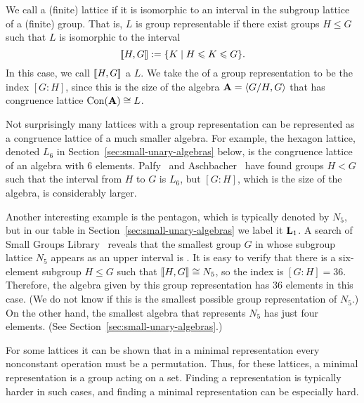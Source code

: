 
We call a (finite) lattice  if 
it is isomorphic to an interval in the subgroup lattice of a (finite) group.
That is, $L$ is group representable if there exist groups $H \leq G$
such that $L$ is isomorphic to the interval
\[
\llbracket H, G\rrbracket := \{K \mid H \leqslant K \leqslant G\}.
\]
In this case, we call $\llbracket H, G\rrbracket$ a  $L$.
We take the  of a group representation to be
the index $[G:H]$, since this is the size of the algebra $\mathbf{A} = \langle G/H, G\rangle$ that has
congruence lattice $\operatorname{Con}(\mathbf{A}) \cong L$.

Not surprisingly many lattices with a group representation
can be represented as a congruence lattice of a much smaller
algebra. For example, the hexagon lattice, denoted $L_6$ in
Section~\ref{sec:small-unary-algebras} below, is the congruence lattice
of an algebra with 6 elements. Palfy~\cite{Palfy1988} and
Aschbacher~\cite{Aschbacher2008} have found groups
$H < G$ such that the interval from $H$ to $G$ is $L_6$, but 
$[G : H]$, which is the size of the algebra, is considerably larger.

Another interesting example is the pentagon, which is typically denoted by
$N_5$, but in our table in Section~\ref{sec:small-unary-algebras} we
label it $\mathbf{L}_1$.  A search of \gaps Small Groups Library~\cite{GAP4}
reveals that the smallest group $G$ in whose subgroup lattice
$N_5$ appears as an upper interval is . It is easy
to verify that there is a six-element subgroup $H\leq G$ such that
$\llbracket H, G\rrbracket \cong N_5$, so the index is $[G:H]= 36$. Therefore,
the algebra given by this group representation has 36 elements in this case.
(We do not know if this is the smallest possible group representation of $N_5$.)
On the other hand, the smallest algebra that represents $N_5$ has just four elements.
(See Section~\ref{sec:small-unary-algebras}.)



For some lattices it can be shown that in a minimal 
representation every nonconstant operation must be a 
permutation.  Thus, for these lattices, a minimal representation is a
group acting on a set. Finding a representation is typically harder in such cases,
and finding a minimal representation can be especially hard.

